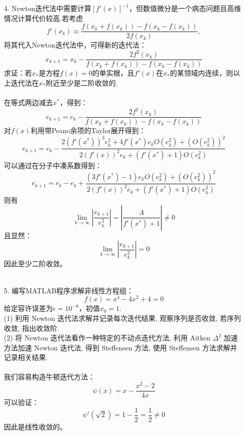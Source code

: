 \documentclass{article}
\begin{document}
\begin{itemize}
		\item[4.]Newton迭代法中需要计算$[f'(x)]^{-1}$，但数值微分是一个病态问题且高维情况计算代价较高.若考虑
		$$
			f'(x_k) \approx \frac{f(x_k+f(x_k)) - f(x_k - f(x_k))}{2f(x_k)},
		$$
		将其代入Newton迭代法中，可得新的迭代法：
		$$
			x_{k+1} = x_k - \frac{2f^2(x_k)}{f(x_k +f(x_k)) - f(x_k - f(x_k))}
		$$
		求证：若$x_*$是方程$f(x) = 0$的单实根，且$f'(x)$在$x_*$的某领域内连续，则以上迭代法在$x_*$附近至少是二阶收敛的.\\
		\\
		在等式两边减去$x^*$，得到：
		$$
			e_{k+1} = e_k - \frac{2f^2(x_k)}{f(x_k + f(x_k)) - f(x_k - f(x_k))}
 		$$
 		对$f(x)$利用带Peano余项的Taylor展开得到：
 		$$
 			e_{k+1} = e_k - \frac{2(f'(x^*))^2e_k^2 + 4f'(x^*)e_kO(e_k^2) + (O(e_k^2))^2}{2(f'(x))^2e_k + (f'(x^*) + 1)O(e_k^2)}
 		$$
 		可以通过在分子中凑系数得到：
 		$$
 			e_{k+1} = e_k - e_k + \frac{(3f'(x^*) - 1)e_kO(e_k^2) + (O(e_k^2))^2}{2(f'(x))^2e_k + (f'(x^*) + 1)O(e_k^2)}
 		$$
 		则有
 		$$
 			\lim\limits_{k\rightarrow\infty}\left|\frac{e_{k+1}}{e_k^2}\right| = \left| \frac{A}{f'(x^*) + 1}\right|\ne 0
 		$$
 		且显然：
 		$$
 				\lim\limits_{k\rightarrow\infty}\left|\frac{e_{k+1}}{e_k^2}\right| = 0
 		$$
 		因此至少二阶收敛。\\
 		\\
 		
		\item[5.] 编写MATLAB程序求解非线性方程组：
		$$f(x) = x^4 - 4x^2 + 4 = 0$$
		给定容许误差为$\epsilon = 10^{-8}$，初值$x_0 = 1$.\\
		(1) 利用 Newton 迭代法求解并记录每次迭代结果, 观察序列是否收敛, 若序列收敛, 指出收敛阶.\\
		(2) 将 Newton 迭代法看作一种特定的不动点迭代方法, 利用 Aitken $\Delta ^2$ 加速方法加速 Newton 迭代法, 得到 Steffensen 方法, 使用 Steffensen 方法求解并记录相关结果.
\\\\
		我们容易构造牛顿迭代方法：
		$$\psi(x) = x - \frac{x^2 - 2}{4x}$$
		可以验证：
		$$\psi'(\sqrt{2}) = 1 - \frac{1}{2} = \frac{1}{2} \ne  0$$
		因此是线性收敛的。\\
	

\end{itemize}
\end{document}
